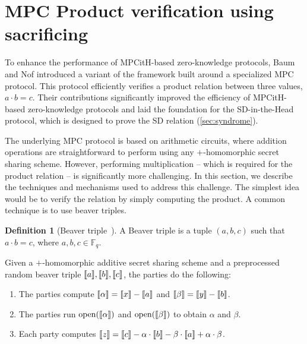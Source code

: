 \documentclass[11pt]{report}
\theoremstyle{definition}
\newtheorem{definition}{Definition}[section]
\theoremstyle{plain}
\begin{document}
\section{MPC Product verification using sacrificing}\label{sec:mpc_sacrificing}

To enhance the performance of MPCitH-based zero-knowledge protocols, Baum and Nof introduced a variant of the framework built around a specialized MPC protocol. This protocol efficiently verifies a product relation between three values, $  a \cdot b = c  $. Their contributions significantly improved the efficiency of MPCitH-based zero-knowledge protocols and laid the foundation for the SD-in-the-Head protocol, which is designed to prove the SD relation (\autoref{sec:syndrome}).

The underlying MPC protocol is based on arithmetic circuits, where addition operations are straightforward to perform using any $ + $-homomorphic secret sharing scheme. However, performing multiplication -- which is required for the product relation -- is significantly more challenging. In this section, we describe the techniques and mechanisms used to address this challenge. The simplest idea would be to verify the relation by simply computing the product. A common technique is to use beaver triples.

\begin{definition}[Beaver triple~\cite{beaver1992efficient}]\label{def:beaver}
  A Beaver triple is a tuple $ (a, b, c) $ such that $ a \cdot b = c $, where $ a, b, c \in \mathbb{F}_q $.
\end{definition}

\begin{protocol}\label{def:beaver-multiplication}
  Given a $+$-homomorphic additive secret sharing scheme and a preprocessed random beaver triple $\llbracket a \rrbracket, \llbracket b \rrbracket, \llbracket c \rrbracket $, the parties do the following:
  \begin{enumerate}
    \item The parties compute $ \llbracket \alpha \rrbracket = \llbracket x \rrbracket - \llbracket a \rrbracket $ and $ \llbracket \beta \rrbracket = \llbracket y \rrbracket - \llbracket b \rrbracket $.
    \item The parties run $ \text{open}(\llbracket \alpha \rrbracket) $ and $ \text{open}(\llbracket \beta \rrbracket) $ to obtain $ \alpha $ and $ \beta $.
    \item Each party computes $ \llbracket z \rrbracket = \llbracket c \rrbracket - \alpha \cdot \llbracket b \rrbracket - \beta \cdot \llbracket a \rrbracket + \alpha \cdot \beta $.
  \end{enumerate}
\end{protocol}
\end{document}

